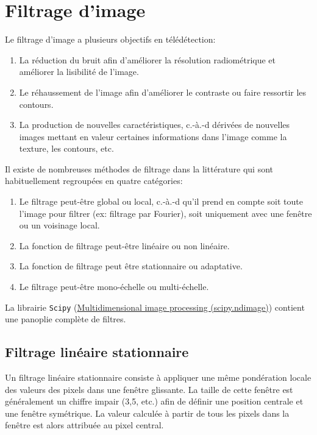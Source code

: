 \documentclass[
  11pt,
  letterpaper,
  open=any,
  twoside=false,
  french]{scrbook}
\begin{document}
\section{Filtrage d'image}\label{filtrage-dimage}

Le filtrage d'image a plusieurs objectifs en télédétection:

\begin{enumerate}
\def\labelenumi{\arabic{enumi}.}
\item
  La réduction du bruit afin d'améliorer la résolution radiométrique et
  améliorer la lisibilité de l'image.
\item
  Le réhaussement de l'image afin d'améliorer le contraste ou faire
  ressortir les contours.
\item
  La production de nouvelles caractéristiques, c.-à.-d dérivées de
  nouvelles images mettant en valeur certaines informations dans l'image
  comme la texture, les contours, etc.
\end{enumerate}

Il existe de nombreuses méthodes de filtrage dans la littérature qui
sont habituellement regroupées en quatre catégories:

\begin{enumerate}
\def\labelenumi{\arabic{enumi}.}
\item
  Le filtrage peut-être global ou local, c.-à.-d qu'il prend en compte
  soit toute l'image pour filtrer (ex: filtrage par Fourier), soit
  uniquement avec une fenêtre ou un voisinage local.
\item
  La fonction de filtrage peut-être linéaire ou non linéaire.
\item
  La fonction de filtrage peut être stationnaire ou adaptative.
\item
  Le filtrage peut-être mono-échelle ou multi-échelle.
\end{enumerate}

La librairie \texttt{Scipy}
(\href{https://docs.scipy.org/doc/scipy/reference/ndimage.html}{Multidimensional
image processing (scipy.ndimage)}) contient une panoplie complète de
filtres.

\subsection{Filtrage linéaire
stationnaire}\label{filtrage-linuxe9aire-stationnaire}

Un filtrage linéaire stationnaire consiste à appliquer une même
pondération locale des valeurs des pixels dans une fenêtre glissante. La
taille de cette fenêtre est généralement un chiffre impair (3,5, etc.)
afin de définir une position centrale et une fenêtre symétrique. La
valeur calculée à partir de tous les pixels dans la fenêtre est alors
attribuée au pixel central.
\end{document}
